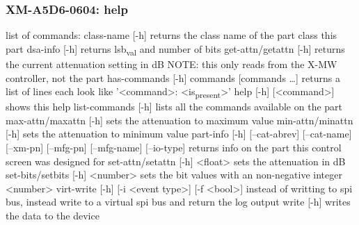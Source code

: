 \documentclass[11pt]{article}
\begin{document}
\subsubsection{XM-A5D6-0604: help}
\label{sec:orgb58de05}
list of commands:
  class-name [-h]
    returns the class name of the part class this part
  dsa-info [-h]
    returns lsb\textsubscript{val} and number of bits
  get-attn/getattn [-h]
    returns the current attenuation setting in dB
    NOTE: this only reads from the X-MW controller, not the part
  has-commands [-h] commands [commands \ldots{}]
    returns a list of lines each look like '<command>: <is\textsubscript{present}>'
  help [-h] [<command>]
    shows this help
  list-commands [-h]
    lists all the commands available on the part
  max-attn/maxattn [-h]
    sets the attenuation to maximum value
  min-attn/minattn [-h]
    sets the attenuation to minimum value
  part-info  [-h] [--cat-abrev] [--cat-name] [--xm-pn] [--mfg-pn] [--mfg-name]
          [--io-type]
    returns info on the part this control screen was designed for
  set-attn/setattn [-h] <float>
    sets the attenuation in dB
  set-bits/setbits [-h] <number>
    sets the bit values with an non-negative integer <number>
  virt-write [-h] [-i <event type>] [-f <bool>]
    instead of writting to spi bus, instead write to a virtual spi bus
    and return the log output
  write [-h]
    writes the data to the device
\end{document}
